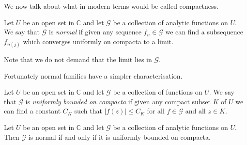 We now talk about what in modern terms would be called
compactness.
\begin{definition} Let $U$ be an open set
in ${\mathbb C}$ and let $\mathcal{G}$ be a collection
of analytic functions on $U$. We say that 
$\mathcal{G}$ is \emph{normal} if given any sequence
$f_{n}\in\mathcal{G}$ we can find a subsequence
$f_{n(j)}$ which converges uniformly on compacta
to a limit.
\end{definition}
Note that we do not demand that the limit lies
in $\mathcal{G}$.

Fortunately normal families have a simpler characterisation. 
\begin{definition} Let $U$ be an open set
in ${\mathbb C}$ and let $\mathcal{G}$ be a collection
of functions on $U$. We say that $\mathcal{G}$
is \emph{uniformly bounded on compacta} if
given any compact subset $K$ of $U$ we can find
a constant $C_{K}$ such that $|f(z)|\leq C_{K}$
for all $f\in \mathcal{G}$ and all $z\in K$.
\end{definition}
\begin{theorem}\label{Normal} Let $U$ be an open set
in ${\mathbb C}$ and let $\mathcal{G}$ be a collection
of analytic functions on $U$. Then $\mathcal{G}$
is normal if and only if it is uniformly bounded on compacta.
\end{theorem}

